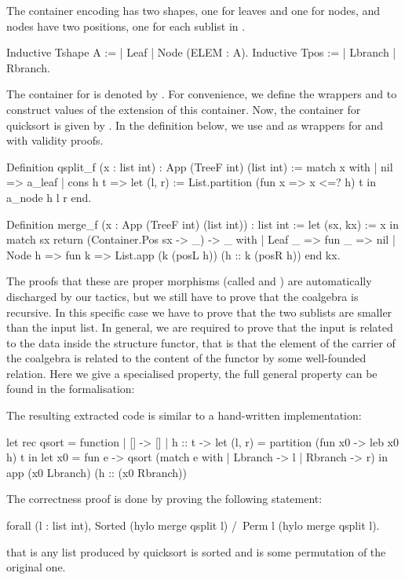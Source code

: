 \documentclass[a4paper,UKenglish,cleveref, autoref, thm-restate]{lipics-v2021}
\begin{document}
The container encoding  has two shapes, one for leaves and one for
nodes, and nodes have two positions, one for each sublist  in
.
\begin{coqcode}
Inductive Tshape A := | Leaf | Node (ELEM : A).
Inductive Tpos := | Lbranch | Rbranch. 
\end{coqcode}
The container for  is denoted by . For convenience, we
define the wrappers  and  to construct values of the
extension of this container.
Now, the container for quicksort is given by .
In the definition below, we use  and  as wrappers for
 and  with validity proofs.
\begin{coqcode}
Definition qsplit_f (x : list int) : App (TreeF int) (list int) :=
  match x with
  | nil => a_leaf
  | cons h t => let (l, r) := List.partition (fun x => x <=? h) t in a_node h l r
  end.

Definition merge_f (x : App (TreeF int) (list int)) : list int :=
  let (sx, kx) := x in
  match sx return (Container.Pos sx -> _) -> _ with
  | Leaf _ => fun _ => nil
  | Node h => fun k => List.app (k (posL h)) (h :: k (posR h))
  end kx.
\end{coqcode}
The proofs that these are proper morphisms (called  and )
are automatically discharged by our tactics, but we still have to prove that the
coalgebra  is recursive. In this specific case we have to prove that
the two sublists are smaller than the input list. In general, we are required to
prove that the input is related to the data inside the structure functor, that
is that the element of the carrier of the coalgebra is related to the content of
the functor by some well-founded relation. Here we give a specialised property, the
full general property can be found in the formalisation:
\begin{coqcode}
Definition respects_relation `{setoid A} (c : Coalg F B) B} (R : B -> B -> Prop)
:= forall x (p : Pos (shape (c x))), R (length (cont (c x) p)) (length x).
\end{coqcode}
The resulting extracted code is similar to a hand-written implementation:
\begin{ocamlcode}
let rec qsort = function
  | [] -> []
  | h :: t -> let (l, r) = partition (fun x0 -> leb x0 h) t in
    let x0 = fun e -> qsort (match e with | Lbranch -> l | Rbranch -> r) in
    app (x0 Lbranch) (h :: (x0 Rbranch))
\end{ocamlcode}
The correctness proof is done by proving the following statement:
\begin{coqcode}
forall (l : list int), Sorted (hylo merge qsplit l) /\ Perm l (hylo merge qsplit l).
\end{coqcode}
that is any list produced by quicksort is sorted and is some permutation of the original one.
\end{document}

